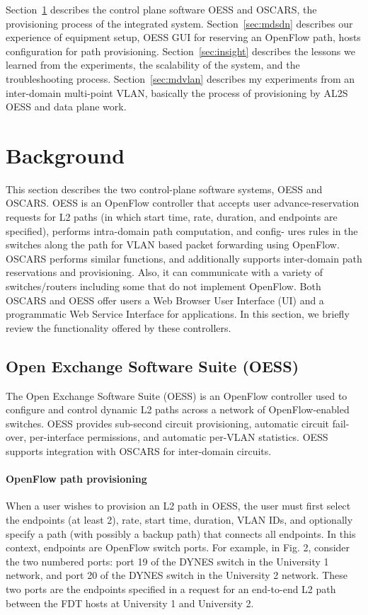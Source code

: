 Section~\ref{sec:control-plane} describes the control plane software OESS and OSCARS, the provisioning process of the integrated system.
Section~\ref{sec:mdsdn} describes our experience of equipment setup, OESS GUI for reserving an OpenFlow path, hosts configuration for path provisioning.
Section~\ref{sec:insight} describes the lessons we learned from the experiments, the scalability of the system, and the troubleshooting process.
Section~\ref{sec:mdvlan} describes my experiments from an inter-domain multi-point VLAN, basically the process of provisioning by AL2S OESS and data plane work.

\section{Background}
\label{sec:control-plane}
This section describes the two control-plane software systems, OESS and OSCARS. OESS is an OpenFlow controller
that accepts user advance-reservation requests for L2 paths
(in which start time, rate, duration, and endpoints are specified), performs intra-domain path computation, and config-
ures rules in the switches along the path for VLAN based
packet forwarding using OpenFlow. OSCARS performs similar functions, and additionally supports inter-domain path
reservations and provisioning. Also, it can communicate
with a variety of switches/routers including some that do not
implement OpenFlow. Both OSCARS and OESS offer users
a Web Browser User Interface (UI) and a programmatic Web Service Interface for applications. In this section, we briefly
review the functionality offered by these controllers.

\subsection{Open Exchange Software Suite (OESS)}

The Open Exchange Software Suite (OESS) is an OpenFlow
controller used to configure and control dynamic L2 paths
across a network of OpenFlow-enabled switches. OESS provides sub-second circuit provisioning, automatic circuit fail-
over, per-interface permissions, and automatic per-VLAN
statistics. OESS supports integration with OSCARS for
inter-domain circuits.

\paragraph{OpenFlow path provisioning}
When a user wishes to provision an L2 path in OESS, the user must first select the endpoints (at least 2), rate, start time, duration, VLAN IDs, and optionally specify a path (with possibly a backup path) that connects all endpoints. In this context, endpoints are OpenFlow switch ports. For example, in Fig. 2, consider the two numbered ports: port 19 of the DYNES switch in the University 1 network, and port 20 of the DYNES switch in the University 2 network. These two ports are the endpoints specified in a request for an end-to-end L2 path between the FDT hosts at University 1 and University 2.

